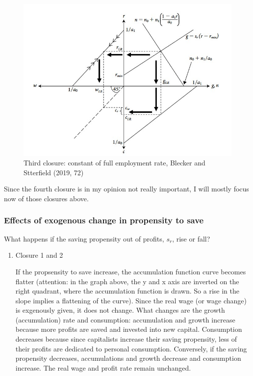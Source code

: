 \documentclass[
  letterpaper,
  DIV=11,
  numbers=noendperiod]{scrreprt}
\begin{document}
\begin{figure}

{\centering \includegraphics[width=5.0625in,height=\textheight]{images/closure_3.jpg}

}

\caption{Third closure: constant of full employment rate, Blecker and
Stterfield (2019, 72)}

\end{figure}

Since the fourth closure is in my opinion not really important, I will
mostly focus now of those closures above.

\hypertarget{effects-of-exogenous-change-in-propensity-to-save}{%
\subsubsection{Effects of exogenous change in propensity to
save}\label{effects-of-exogenous-change-in-propensity-to-save}}

What happens if the saving propensity out of profits, \(s_r\), rise or
fall?

\begin{enumerate}
\def\labelenumi{\arabic{enumi}.}
\item
  Closure 1 and 2

  If the propsensity to save increase, the accumulation function curve
  becomes flatter (attention: in the graph above, the y and x axis are
  inverted on the right quadrant, where the accumulation function is
  drawn. So a rise in the slope implies a flattening of the curve).
  Since the real wage (or wage change) is exgenously given, it does not
  change. What changes are the growth (accumulation) rate and
  consumption: accumulation and growth increase because more profits are
  saved and invested into new capital. Consumption decreases because
  since capitalists increase their saving propensity, less of their
  profits are dedicated to personal consumption. Conversely, if the
  saving propensity decreases, accumulations and growth decrease and
  consumption increase. The real wage and profit rate remain unchanged.
\end{enumerate}
\end{document}
